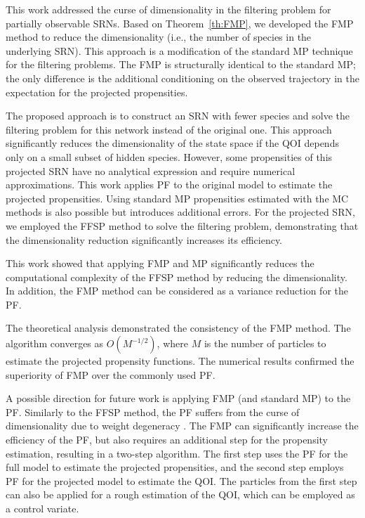 This work addressed the curse of dimensionality in the filtering problem for partially observable \acp{SRN}. Based on Theorem~\ref{th:FMP}, we developed the \ac{FMP} method to reduce the dimensionality (i.e., the number of species in the underlying \ac{SRN}). This approach is a modification of the standard \ac{MP} technique for the filtering problems. The \ac{FMP} is structurally identical to the standard \ac{MP}; the only difference is the additional conditioning on the observed trajectory in the expectation for the projected propensities. 

The proposed approach is to construct an \ac{SRN} with fewer species and solve the filtering problem for this network instead of the original one. This approach significantly reduces the dimensionality of the state space if the \ac{QOI} depends only on a small subset of hidden species. However, some propensities of this projected \ac{SRN} have no analytical expression and require numerical approximations. This work applies \ac{PF} to the original model to estimate the projected propensities. Using standard \ac{MP} propensities estimated with the \ac{MC} methods is also possible but introduces additional errors. For the projected \ac{SRN}, we employed the \ac{FFSP} method to solve the filtering problem, demonstrating that the dimensionality reduction significantly increases its efficiency.

This work showed that applying \ac{FMP} and \ac{MP} significantly reduces the computational complexity of the \ac{FFSP} method by reducing the dimensionality. In addition, the \ac{FMP} method can be considered as a variance reduction for the \ac{PF}.

The theoretical analysis demonstrated the consistency of the \ac{FMP} method. The algorithm converges as $O(M^{-1/2})$, where $M$ is the number of particles to estimate the projected propensity functions. The numerical results confirmed the superiority of \ac{FMP} over the commonly used \ac{PF}. 

A possible direction for future work is applying \ac{FMP} (and standard \ac{MP}) to the \ac{PF}. Similarly to the \ac{FFSP} method, the \ac{PF} suffers from the curse of dimensionality due to weight degeneracy \cite{Snyder2008HighDimPF, Djuric2013HighDimPF}. The \ac{FMP} can significantly increase the efficiency of the \ac{PF}, but also requires an additional step for the propensity estimation, resulting in a two-step algorithm. The first step uses the \ac{PF} for the full model to estimate the projected propensities, and the second step employs \ac{PF} for the projected model to estimate the \ac{QOI}. The particles from the first step can also be applied for a rough estimation of the \ac{QOI}, which can be employed as a control variate. 

